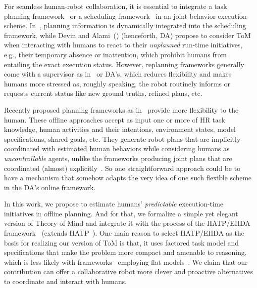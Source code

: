 \documentclass[letterpaper]{article} %
\begin{document}
For seamless human-robot collaboration, it is essential to integrate a task planning framework~\cite{lallement2018hatp} or a scheduling framework~\cite{ferreira2021scheduling} in an  joint behavior execution scheme. 
In~\cite{PupaS21}, planning information is dynamically integrated into the scheduling framework, while Devin and Alami~(\citeyear{devin2016implemented}) (henceforth, DA) propose to consider ToM when interacting with humans to react to their \textit{unplanned} run-time initiatives,
e.g., their temporary absence or inattention, which prohibit humans from entailing the exact execution status. 
However, replanning frameworks generally come with a supervisor as in~\cite{johannsmeier2016hierarchical} or DA's, which
reduces flexibility and makes humans more stressed as, roughly speaking, the robot routinely informs or requests current status like new ground truths, refined plans, etc.

Recently proposed planning frameworks as in~\cite{buisan:hal-03684211,UnhelkarLS19} provide more flexibility to the human. These offline approaches accept as input one or more of HR task knowledge, human activities and their intentions, environment states, model specifications, shared goals, etc. 
They generate robot plans that are implicitly coordinated with estimated human behaviors while considering humans as {\em uncontrollable} agents, unlike the frameworks producing joint plans that are coordinated (almost) explicitly~\cite{alami2006toward,lallement2018hatp,roncone2017transparent}.
So one straightforward approach could be to have a mechanism that somehow adapts the very idea of one such flexible scheme in the DA's online framework. 

In this work, we propose to estimate humans' \textit{predictable} execution-time initiatives in offline planning. And for that, we formalize a simple yet elegant version of Theory of Mind and integrate it with the process of the HATP/EHDA framework~\cite{buisan:hal-03684211} (extends  HATP~\cite{lallement2018hatp,CirilloKS09}). 
One main reason to select HATP/EHDA as the basis for realizing our version of ToM is that, it uses factored task model and specifications that make the problem more compact and amenable to   reasoning, which is less likely with frameworks~\cite{unhelkar2019learning} employing flat models~\cite{levine2014concurrent,unhelkar2019learning}.
We claim that our contribution can offer a collaborative robot more clever and proactive alternatives to coordinate and interact with humans.
\end{document}
